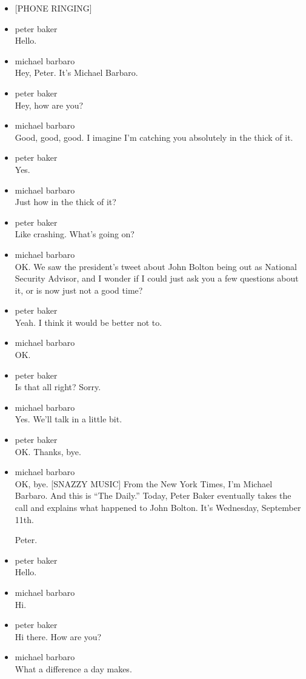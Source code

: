 \begin{itemize}
\item
  {[}PHONE RINGING{]}
\item
  peter baker\\
  Hello.
\item
  michael barbaro\\
  Hey, Peter. It's Michael Barbaro.
\item
  peter baker\\
  Hey, how are you?
\item
  michael barbaro\\
  Good, good, good. I imagine I'm catching you absolutely in the thick
  of it.
\item
  peter baker\\
  Yes.
\item
  michael barbaro\\
  Just how in the thick of it?
\item
  peter baker\\
  Like crashing. What's going on?
\item
  michael barbaro\\
  OK. We saw the president's tweet about John Bolton being out as
  National Security Advisor, and I wonder if I could just ask you a few
  questions about it, or is now just not a good time?
\item
  peter baker\\
  Yeah. I think it would be better not to.
\item
  michael barbaro\\
  OK.
\item
  peter baker\\
  Is that all right? Sorry.
\item
  michael barbaro\\
  Yes. We'll talk in a little bit.
\item
  peter baker\\
  OK. Thanks, bye.
\item
  michael barbaro\\
  OK, bye. {[}SNAZZY MUSIC{]} From the New York Times, I'm Michael
  Barbaro. And this is ``The Daily.'' Today, Peter Baker eventually
  takes the call and explains what happened to John Bolton. It's
  Wednesday, September 11th.

  Peter.
\item
  peter baker\\
  Hello.
\item
  michael barbaro\\
  Hi.
\item
  peter baker\\
  Hi there. How are you?
\item
  michael barbaro\\
  What a difference a day makes.


\end{itemize}
